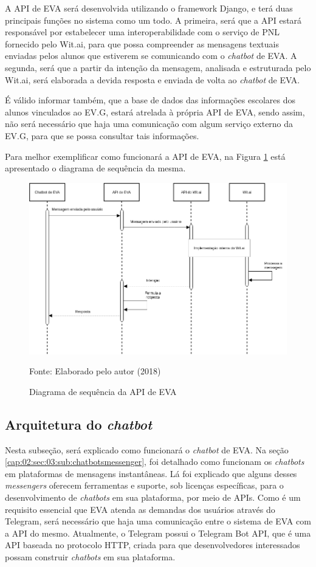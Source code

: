 A API de EVA será desenvolvida utilizando o framework Django, e terá duas principais funções no sistema como um todo. A primeira, será que a API estará responsável por estabelecer uma interoperabilidade com o serviço de PNL fornecido pelo Wit.ai, para que possa compreender as mensagens textuais enviadas pelos alunos que estiverem se comunicando com o \textit{chatbot} de EVA. A segunda, será que a partir da intenção da mensagem, analisada e estruturada pelo Wit.ai, será elaborada a devida resposta e enviada de volta ao \textit{chatbot} de EVA.

É válido informar também, que a base de dados das informações escolares dos alunos vinculados ao EV.G, estará atrelada à própria API de EVA, sendo assim, não será necessário que haja uma comunicação com algum serviço externo da EV.G, para que se possa consultar tais informações.

Para melhor exemplificar como funcionará a API de EVA, na Figura \ref{cap:03:fig:diagrama-sequencia-1} está apresentado o diagrama de sequência da mesma.
\begin{figure}[htb!]
    \centering
    \includegraphics[width=0.7\linewidth]{src/imagens/EVAAPISEQUENCE.png}
    \caption{Diagrama de sequência da API de EVA} Fonte: Elaborado pelo autor (2018)
    \label{cap:03:fig:diagrama-sequencia-1}
\end{figure}

\subsection{Arquitetura do \textit{chatbot}}

Nesta subseção, será explicado como funcionará o \textit{chatbot} de EVA. Na seção \ref{cap:02:sec:03:sub:chatbotsmessenger}, foi detalhado como funcionam os \textit{chatbots} em plataformas de mensagens instantâneas. Lá foi explicado que alguns desses \textit{messengers} oferecem ferramentas e suporte, sob licenças específicas, para o desenvolvimento de \textit{chatbots} em sua plataforma, por meio de APIs. Como é um requisito essencial que EVA atenda as demandas dos usuários através do Telegram, será necessário que haja uma comunicação entre o sistema de EVA com a API do mesmo. Atualmente, o Telegram possui o Telegram Bot API, que é uma API baseada no protocolo HTTP, criada para que desenvolvedores interessados possam construir \textit{chatbots} em sua plataforma.

